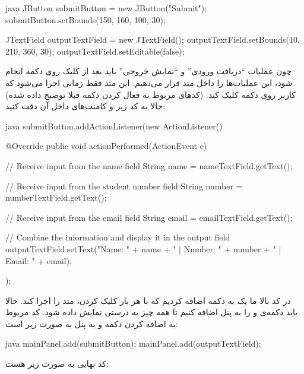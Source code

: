 \begin{codebox}{java}
JButton submitButton = new JButton("Submit");  
submitButton.setBounds(150, 160, 100, 30);

JTextField outputTextField = new JTextField();  
outputTextField.setBounds(10, 210, 360, 30);  
outputTextField.setEditable(false);
\end{codebox}

چون عملیات ``دریافت ورودی'' و ``نمایش خروجی'' باید بعد از کلیک روی دکمه
 انجام شود، این عملیات‌ها را داخل متد
 قرار می‌دهیم. این متد فقط زمانی اجرا
می‌شود که کاربر روی دکمه کلیک کند. (کدهای مربوط به فعال کردن دکمه قبلا
توضیح داده شده) حالا به کد زیر و کامنت‌های داخل آن دقت کنید:

\begin{codebox}{java}
submitButton.addActionListener(new ActionListener() {
   @Override
   public void actionPerformed(ActionEvent e) {

      // Receive input from the name field  
      String name = nameTextField.getText();

      // Receive input from the student number field  
      String number = numberTextField.getText();

      // Receive input from the email field  
      String email = emailTextField.getText();

      // Combine the information and display it in the output field
      outputTextField.setText("Name: " + name + " | Number: " + number + " | Email: " + email);  
   }  
});
\end{codebox}

در کد بالا ما یک  به دکمه اضافه کردیم که با
هر بار کلیک کردن، متد  را اجرا کند. حالا
باید دکمه‌ی  و  را به
پنل اضافه کنیم تا همه چیز به درستی نمایش داده شود. کد مربوط به اضافه
کردن دکمه و  به پنل به صورت زیر است:

\begin{codebox}{java}
mainPanel.add(submitButton);  
mainPanel.add(outputTextField);
\end{codebox}

کد نهایی به صورت زیر هست:

